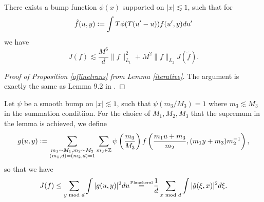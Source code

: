 \begin{lemma} \label{iterative}
    There exists a bump function $\phi(x)$ supported on $|x|\lesssim 1$, such that for \[
    \tilde{f}(u,y) \mathrel{\mathop:}= \int T \phi(T(u'-u)) f(u',y) du'
    \]
    we have \[
    J(f)\lesssim \frac{M^6}{d}\|f\|_{L_1}^2 + M^2 \|f\|_{L_2} J(\tilde{f}).
    \]
\end{lemma}

\begin{proof}[Proof of Proposition \ref{affinetrans} from Lemma \ref{iterative}]
    The argument is exactly the same as Lemma 9.2 in \cite{GM2024}.
\end{proof}
Let $\psi$ be a smooth bump on $|x|\lesssim 1$, such that $\psi(m_3/M_3)=1$ where $m_3\lesssim M_3$ in the summation conditiion. 
For the choice of $M_1,M_2,M_3$ that the supremum in the lemma is achieved, we define \[
    g(u,y)\mathrel{\mathop:}=\sum_{\substack{m_1\sim M_1,m_2\sim M_2\\ (m_1,d)=(m_2,d)=1}} \sum_{m_3\in \mathbb{Z}} \psi\left(\frac{m_3}{M_3}\right)f\left(\frac{m_1 u+m_3}{m_2} , (m_1 y+m_3)m_2^{-1}\right),
\]so that we have \[
J(f)\leq \sum_{y\mod d} \int |g(u,y)|^2 du \quad \stackeq{Plancheral} \quad  \frac{1}{d}\sum_{x\mod d} \int |\hat{g}(\xi,x)|^2 d\xi.
\]
